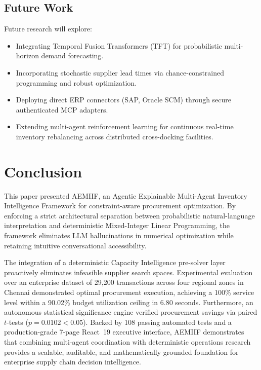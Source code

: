 \documentclass[conference]{IEEEtran}
\begin{document}
\subsection{Future Work}
Future research will explore:
\begin{itemize}
    \item Integrating Temporal Fusion Transformers (TFT) for probabilistic multi-horizon demand forecasting.
    \item Incorporating stochastic supplier lead times via chance-constrained programming and robust optimization.
    \item Deploying direct ERP connectors (SAP, Oracle SCM) through secure authenticated MCP adapters.
    \item Extending multi-agent reinforcement learning for continuous real-time inventory rebalancing across distributed cross-docking facilities.
\end{itemize}

\section{Conclusion}
This paper presented AEMIIF, an Agentic Explainable Multi-Agent Inventory Intelligence Framework for constraint-aware procurement optimization. By enforcing a strict architectural separation between probabilistic natural-language interpretation and deterministic Mixed-Integer Linear Programming, the framework eliminates LLM hallucinations in numerical optimization while retaining intuitive conversational accessibility.

The integration of a deterministic Capacity Intelligence pre-solver layer proactively eliminates infeasible supplier search spaces. Experimental evaluation over an enterprise dataset of 29,200 transactions across four regional zones in Chennai demonstrated optimal procurement execution, achieving a 100\% service level within a 90.02\% budget utilization ceiling in 6.80 seconds. Furthermore, an autonomous statistical significance engine verified procurement savings via paired $t$-tests ($p = 0.0102 < 0.05$). Backed by 108 passing automated tests and a production-grade 7-page React~19 executive interface, AEMIIF demonstrates that combining multi-agent coordination with deterministic operations research provides a scalable, auditable, and mathematically grounded foundation for enterprise supply chain decision intelligence.
\end{document}
